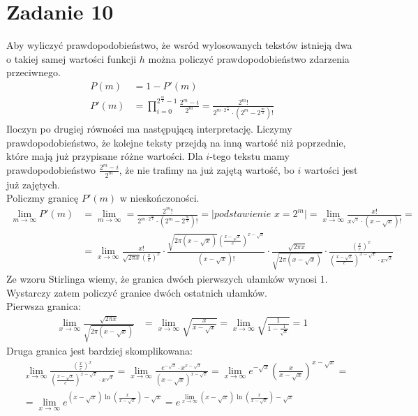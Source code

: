\documentclass{article}
\begin{document}
\section{Zadanie 10}
Aby wyliczyć prawdopodobieństwo, że wsród wylosowanych tekstów istnieją dwa o takiej samej wartości funkcji $h$ można policzyć prawdopodobieństwo zdarzenia przeciwnego.
\begin{align}
    P(m) &= 1 - P'(m) \\
    P'(m) &= \prod_{i=0}^{2^{\frac{m}{2}} - 1} \frac{2^m - i}{2^m} = \frac{2^m!}{2^{m\cdot 2^\frac{m}{2}} \cdot (2^m - 2^\frac{m}{2})!}
\end{align}
Iloczyn po drugiej równości ma następującą interpretację. Liczymy prawdopodobieństwo, że kolejne teksty przejdą na inną wartość niż poprzednie, które mają już przypisane różne wartości. Dla $i$-tego tekstu mamy prawdopodobieństwo $\frac{2^m-i}{2^m}$, że nie trafimy na już zajętą wartość, bo $i$ wartości jest już zajętych.\\
Policzmy granicę $P'(m)$ w nieskończoności.
\begin{align}
    \lim_{m\rightarrow \infty} P'(m) &= \lim_{m\rightarrow \infty} = \frac{2^m!}{2^{m\cdot 2^\frac{m}{2}} \cdot (2^m - 2^\frac{m}{2})!} = \bigg| \textit{podstawienie }x = 2^m\bigg| = \lim_{x\rightarrow \infty} \frac{x!}{x^{\sqrt{x}} \cdot (x - \sqrt{x})!} = \\
    &= \lim_{x\rightarrow \infty} \frac{x!}{\sqrt{2\pi x} (\frac{x}{e})^x} \cdot \frac{\sqrt{2\pi(x-\sqrt{x})}(\frac{x-\sqrt{x}}{e})^{x-\sqrt{x}}}{(x-\sqrt{x})!} \cdot \frac{\sqrt{2\pi x}}{\sqrt{2\pi(x-\sqrt{x})}} \cdot \frac{(\frac{x}{e})^x}{(\frac{x - \sqrt{x}}{e})^{x-\sqrt{x}} \cdot x^{\sqrt{x}}} 
\end{align}
Ze wzoru Stirlinga wiemy, że granica dwóch pierwszych ułamków wynosi 1. Wystarczy zatem policzyć granice dwóch ostatnich ułamków.\\
Pierwsza granica:
\begin{align}
    \lim_{x\rightarrow \infty} \frac{\sqrt{2\pi x}}{\sqrt{2\pi(x-\sqrt{x})}} &= \lim_{x\rightarrow \infty} \sqrt{\frac{x}{x-\sqrt{x}}} = \lim_{x\rightarrow \infty} \sqrt{\frac{1}{1-\frac{1}{\sqrt{x}}}} = 1
\end{align}
Druga granica jest bardziej skomplikowana:
\begin{align}
    &\lim_{x\rightarrow \infty} \frac{(\frac{x}{e})^x}{(\frac{x - \sqrt{x}}{e})^{x-\sqrt{x}} \cdot x^{\sqrt{x}}} = \lim_{x\rightarrow \infty} \frac{e^{-\sqrt{x}} \cdot x^{x-\sqrt{x}}}{(x-\sqrt{x})^{x-\sqrt{x}}} = \lim_{x\rightarrow \infty} e^{-\sqrt{x}} \left(\frac{x}{x-\sqrt{x}}\right)^{x-\sqrt{x}} =\\ 
    &= \lim_{x\rightarrow \infty} e^{\displaystyle  (x-\sqrt{x})\ln{\left(\frac{x}{x-\sqrt{x}}\right)} - \sqrt{x}} =
    e^{\displaystyle \lim_{x\rightarrow \infty} (x-\sqrt{x})\ln{\left(\frac{x}{x-\sqrt{x}}\right)} - \sqrt{x}}
\end{align}
\end{document}
